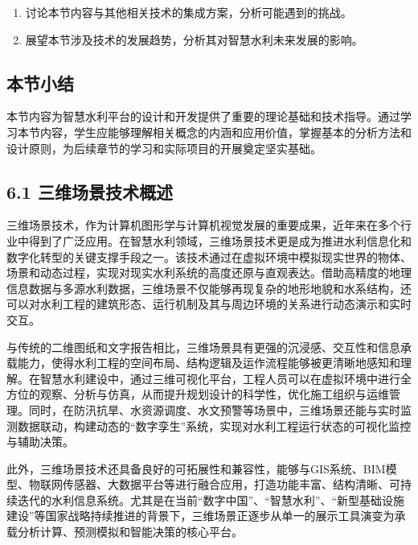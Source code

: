 \begin{enumerate}
\def\labelenumi{\arabic{enumi}.}
\tightlist
\item
  讨论本节内容与其他相关技术的集成方案，分析可能遇到的挑战。
\item
  展望本节涉及技术的发展趋势，分析其对智慧水利未来发展的影响。
\end{enumerate}

\hypertarget{ux672cux8282ux5c0fux7ed3}{%
\subsection{本节小结}\label{ux672cux8282ux5c0fux7ed3}}

本节内容为智慧水利平台的设计和开发提供了重要的理论基础和技术指导。通过学习本节内容，学生应能够理解相关概念的内涵和应用价值，掌握基本的分析方法和设计原则，为后续章节的学习和实际项目的开展奠定坚实基础。

\hypertarget{ux4e09ux7ef4ux573aux666fux6280ux672fux6982ux8ff0}{%
\subsection{6.1 三维场景技术概述}\label{ux4e09ux7ef4ux573aux666fux6280ux672fux6982ux8ff0}}

三维场景技术，作为计算机图形学与计算机视觉发展的重要成果，近年来在多个行业中得到了广泛应用。在智慧水利领域，三维场景技术更是成为推进水利信息化和数字化转型的关键支撑手段之一。该技术通过在虚拟环境中模拟现实世界的物体、场景和动态过程，实现对现实水利系统的高度还原与直观表达。借助高精度的地理信息数据与多源水利数据，三维场景不仅能够再现复杂的地形地貌和水系结构，还可以对水利工程的建筑形态、运行机制及其与周边环境的关系进行动态演示和实时交互。

与传统的二维图纸和文字报告相比，三维场景具有更强的沉浸感、交互性和信息承载能力，使得水利工程的空间布局、结构逻辑及运作流程能够被更清晰地感知和理解。在智慧水利建设中，通过三维可视化平台，工程人员可以在虚拟环境中进行全方位的观察、分析与仿真，从而提升规划设计的科学性，优化施工组织与运维管理。同时，在防汛抗旱、水资源调度、水文预警等场景中，三维场景还能与实时监测数据联动，构建动态的``数字孪生''系统，实现对水利工程运行状态的可视化监控与辅助决策。

此外，三维场景技术还具备良好的可拓展性和兼容性，能够与GIS系统、BIM模型、物联网传感器、大数据平台等进行融合应用，打造功能丰富、结构清晰、可持续迭代的水利信息系统。尤其是在当前``数字中国''、``智慧水利''、``新型基础设施建设''等国家战略持续推进的背景下，三维场景正逐步从单一的展示工具演变为承载分析计算、预测模拟和智能决策的核心平台。

